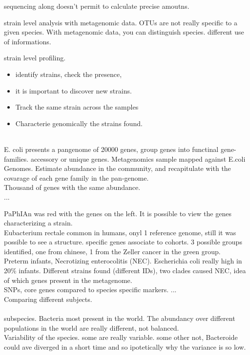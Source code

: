 sequencing along doesn't permit to calculate precise amoutns. 

strain level analysis with metagenomic data. OTUs are not really specific to a given species. With metagenomic data, you can distinguish species. 
different use of informations.

strain level profiling.
\begin{itemize}
	\item identify strains, check the presence, 
	\item it is important to discover new strains.
	\item Track the same strain across the samples 
	\item Characterie genomically the strains found. 
\end{itemize}\\

E. coli presents a pangenome of 20000 genes, group genes into functinal gene-families. accessory or unique genes. 
Metagenomics sample mapped against E.coli Genomes. Estimate abundance in the community, and recapitulate with the covarage of each gene family in the pan-genome. \\

Thousand of genes with the same abundance. \\

...


PaPhIAn was red with the genes on the left. It is possible to view the genes characterizing a strain.\\

Eubacterium rectale common in humans, onyl 1 reference genome, still it was possible to see a structure. specific genes associate to cohorts. 3 possible groups identified, one from chinese, 1 from the Zeller cancer in the green group.\\

Preterm infants, Necrotizing enterocolitis (NEC). Escherichia coli really high in 20\% infants. Different strains found (different IDs), two clades caused NEC, idea of which genes present in the metagenome. \\

SNPs, core genes compared to species specific markers. ...\\

Comparing different subjects. \\
\\
subspecies. Bacteria most present in the world. The abundancy over different populations in the world are really different, not balanced. \\
Variability of the species. some are really variable. some other not, Bacteroide could ave diverged in a short time and so ipotetically why the variance is so low. 


